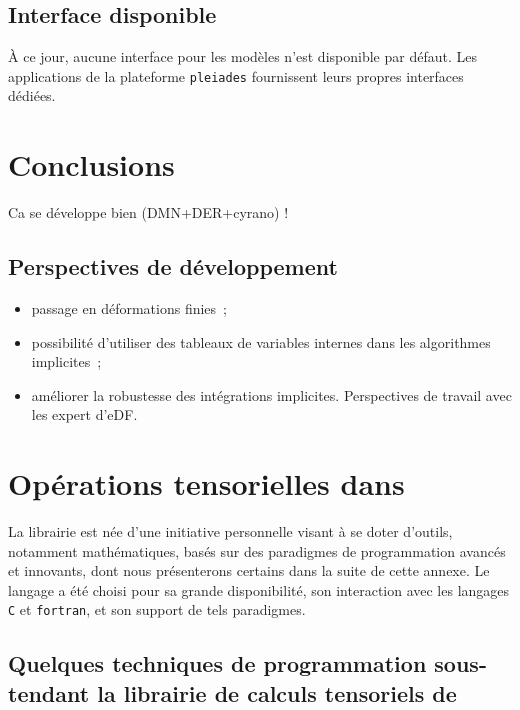 \documentclass[rectoverso,pleiades,pstricks,leqno,anti]{texmf/note_technique_2010}
\newcommand{\pleiades}{\texttt{pleiades}}
\newcommand{\tfel}[1]{\index{tfel}{#1}{\texttt{#1}}}
\def\ifmonospace{\ifdim\fontdimen3\font=0pt }
\def\cpp{%
\ifmonospace%
    C++%
\else%
    C\kern-.1667em\raise.30ex\hbox{\smaller{++}}%
\fi%
\spacefactor1000 }
\begin{document}
\subsection{Interface disponible} À ce jour, aucune interface pour les
modèles n'est disponible par défaut. Les applications de la plateforme
\pleiades{} fournissent leurs propres interfaces dédiées.

\clearpage
\newpage
\section{Conclusions}

Ca se développe bien (DMN+DER+cyrano) !

\subsection{Perspectives de développement}

\begin{itemize}
  \item passage en déformations finies~;
  \item possibilité d'utiliser des tableaux de variables internes dans
  les algorithmes implicites~;
  \item améliorer la robustesse des intégrations implicites.
  Perspectives de travail avec les expert d'eDF.
\end{itemize}

\clearpage
\newpage
{}
\listetableaux
\listefigures

\appendix
\section{Opérations tensorielles dans \tfel{}}

La librairie \tfel{} est née d'une initiative personnelle visant à se
doter d'outils, notamment mathématiques, basés sur des paradigmes de
programmation avancés et innovants, dont nous présenterons certains
dans la suite de cette annexe. Le langage \cpp{} a été choisi pour sa
grande disponibilité, son interaction avec les langages \texttt{C} et
\texttt{fortran}, et son support de tels paradigmes.

\subsection{Quelques techniques de programmation sous-tendant la
  librairie de calculs tensoriels de \tfel{}}
\end{document}

